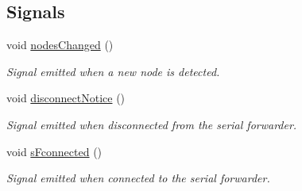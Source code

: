 \subsection*{Signals}
\begin{DoxyCompactItemize}
\item 
\hypertarget{classpacketHandler_a0e8f4d081f531b5e568c052f5b8babb9}{
void \hyperlink{classpacketHandler_a0e8f4d081f531b5e568c052f5b8babb9}{nodesChanged} ()}
\label{classpacketHandler_a0e8f4d081f531b5e568c052f5b8babb9}

\begin{DoxyCompactList}\small\item\em Signal emitted when a new node is detected. \item\end{DoxyCompactList}\item 
\hypertarget{classpacketHandler_a033895b001ec68791c5d0872df03e626}{
void \hyperlink{classpacketHandler_a033895b001ec68791c5d0872df03e626}{disconnectNotice} ()}
\label{classpacketHandler_a033895b001ec68791c5d0872df03e626}

\begin{DoxyCompactList}\small\item\em Signal emitted when disconnected from the serial forwarder. \item\end{DoxyCompactList}\item 
\hypertarget{classpacketHandler_ad3e95ebbb80274b826502fb84f8f100b}{
void \hyperlink{classpacketHandler_ad3e95ebbb80274b826502fb84f8f100b}{sFconnected} ()}
\label{classpacketHandler_ad3e95ebbb80274b826502fb84f8f100b}

\begin{DoxyCompactList}\small\item\em Signal emitted when connected to the serial forwarder. \item\end{DoxyCompactList}\end{DoxyCompactItemize}
